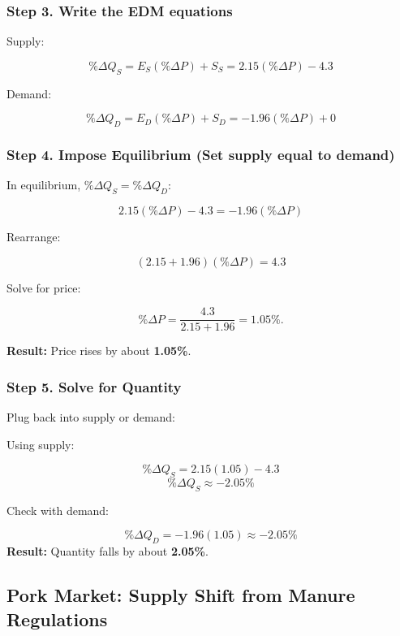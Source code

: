 \documentclass[
  letterpaper,
  DIV=11,
  numbers=noendperiod]{scrartcl}
\begin{document}
\subsubsection{Step 3. Write the EDM
equations}\label{step-3.-write-the-edm-equations}

Supply:

\[
\% \Delta Q_S = E_S (\% \Delta P) + S_S = 2.15(\% \Delta P) - 4.3
\]

Demand:

\[
\% \Delta Q_D = E_D (\% \Delta P) + S_D = -1.96(\% \Delta P) + 0
\]

\subsubsection{Step 4. Impose Equilibrium (Set supply equal to
demand)}\label{step-4.-impose-equilibrium-set-supply-equal-to-demand}

In equilibrium, \(\% \Delta Q_S = \% \Delta Q_D\):

\[
2.15(\% \Delta P) - 4.3 = -1.96(\% \Delta P)
\]

Rearrange:

\[
(2.15 + 1.96)(\% \Delta P) = 4.3
\]

Solve for price:

\[
\% \Delta P = \frac{4.3}{2.15+1.96} = 1.05 \%.
\]

\textbf{Result:} Price rises by about \textbf{1.05\%}.

\subsubsection{Step 5. Solve for
Quantity}\label{step-5.-solve-for-quantity}

Plug back into supply or demand:

Using supply:

\[
\% \Delta Q_S = 2.15(1.05) - 4.3
\] \[
\% \Delta Q_S \approx -2.05\%
\]

Check with demand:

\[
\% \Delta Q_D = -1.96(1.05) \approx -2.05\%
\] \textbf{Result:} Quantity falls by about \textbf{2.05\%}.

\subsection{Pork Market: Supply Shift from Manure
Regulations}\label{pork-market-supply-shift-from-manure-regulations}
\end{document}
